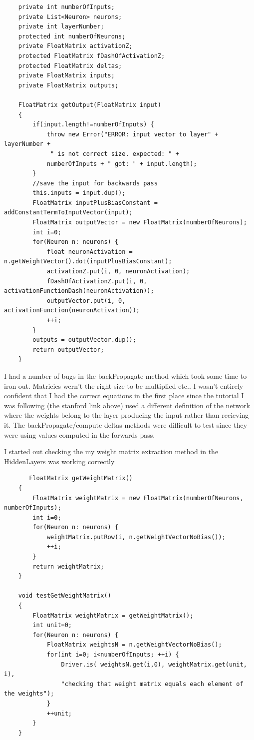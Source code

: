 \documentclass[11pt]{article} %
\begin{document}
\begin{lstlisting}
    private int numberOfInputs;
    private List<Neuron> neurons;
    private int layerNumber;
    protected int numberOfNeurons;
    private FloatMatrix activationZ;
    protected FloatMatrix fDashOfActivationZ;
    protected FloatMatrix deltas;
    private FloatMatrix inputs;
    private FloatMatrix outputs;

    FloatMatrix getOutput(FloatMatrix input)
    {
        if(input.length!=numberOfInputs) {
            throw new Error("ERROR: input vector to layer" + layerNumber +
             " is not correct size. expected: " +
            numberOfInputs + " got: " + input.length);
        }
        //save the input for backwards pass
        this.inputs = input.dup();
        FloatMatrix inputPlusBiasConstant = addConstantTermToInputVector(input);
        FloatMatrix outputVector = new FloatMatrix(numberOfNeurons);
        int i=0;
        for(Neuron n: neurons) {
            float neuronActivation = n.getWeightVector().dot(inputPlusBiasConstant);
            activationZ.put(i, 0, neuronActivation);
            fDashOfActivationZ.put(i, 0, activationFunctionDash(neuronActivation));
            outputVector.put(i, 0, activationFunction(neuronActivation));
            ++i;
        }
        outputs = outputVector.dup();
        return outputVector;
    }
\end{lstlisting}
I had a number of bugs in the backPropagate method which took some time to iron out. Matricies wern't the right size to be multiplied etc.. I wasn't entirely confident that I had the correct equations in the first place since the tutorial I was following (the stanford link above) used a  different definition of the network where the weights belong to the layer producing the input rather than recieving it. The backPropagate/compute deltas methods were difficult to test since they were using values computed in the forwards pass.

 I started out checking the my weight matrix extraction method in the HiddenLayers was working correctly

\begin{lstlisting}
       FloatMatrix getWeightMatrix()
    {
        FloatMatrix weightMatrix = new FloatMatrix(numberOfNeurons, numberOfInputs);
        int i=0;
        for(Neuron n: neurons) {
            weightMatrix.putRow(i, n.getWeightVectorNoBias());
            ++i;
        }
        return weightMatrix;
    }

    void testGetWeightMatrix()
    {
        FloatMatrix weightMatrix = getWeightMatrix();
        int unit=0;
        for(Neuron n: neurons) {
            FloatMatrix weightsN = n.getWeightVectorNoBias();
            for(int i=0; i<numberOfInputs; ++i) {
                Driver.is( weightsN.get(i,0), weightMatrix.get(unit, i),
                "checking that weight matrix equals each element of the weights");
            }
            ++unit;
        }
    }
    
    \end{lstlisting}
\end{document}
